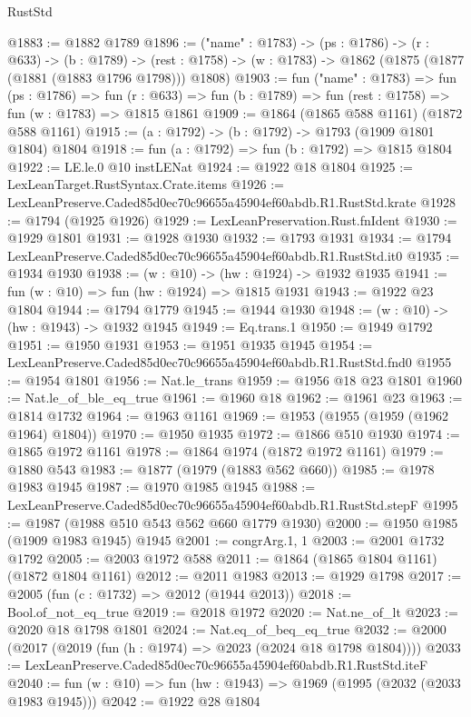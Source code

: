 \begin{lexlean}{RustStd}
\begin{coremodule}
@1883 := @1882 @1789
@1896 := ("name" : @1783) ->
  (ps : @1786) ->
  (r : @633) ->
  (b : @1789) ->
  (rest : @1758) -> (w : @1783) -> @1862 (@1875 (@1877 (@1881 (@1883 @1796 @1798))) @1808)
@1903 := fun ("name" : @1783) =>
  fun (ps : @1786) =>
  fun (r : @633) => fun (b : @1789) => fun (rest : @1758) => fun (w : @1783) => @1815 @1861
@1909 := @1864 (@1865 @588 @1161) (@1872 @588 @1161)
@1915 := (a : @1792) -> (b : @1792) -> @1793 (@1909 @1801 @1804) @1804
@1918 := fun (a : @1792) => fun (b : @1792) => @1815 @1804
@1922 := LE.le.{0} @10 instLENat
@1924 := @1922 @18 @1804
@1925 := LexLeanTarget.RustSyntax.Crate.items
@1926 := LexLeanPreserve.Caded85d0ec70c96655a45904ef60abdb.R1.RustStd.krate
@1928 := @1794 (@1925 @1926)
@1929 := LexLeanPreservation.Rust.fnIdent
@1930 := @1929 @1801
@1931 := @1928 @1930
@1932 := @1793 @1931
@1934 := @1794 LexLeanPreserve.Caded85d0ec70c96655a45904ef60abdb.R1.RustStd.it0
@1935 := @1934 @1930
@1938 := (w : @10) -> (hw : @1924) -> @1932 @1935
@1941 := fun (w : @10) => fun (hw : @1924) => @1815 @1931
@1943 := @1922 @23 @1804
@1944 := @1794 @1779
@1945 := @1944 @1930
@1948 := (w : @10) -> (hw : @1943) -> @1932 @1945
@1949 := Eq.trans.{1}
@1950 := @1949 @1792
@1951 := @1950 @1931
@1953 := @1951 @1935 @1945
@1954 := LexLeanPreserve.Caded85d0ec70c96655a45904ef60abdb.R1.RustStd.fnd0
@1955 := @1954 @1801
@1956 := Nat.le_trans
@1959 := @1956 @18 @23 @1801
@1960 := Nat.le_of_ble_eq_true
@1961 := @1960 @18
@1962 := @1961 @23
@1963 := @1814 @1732
@1964 := @1963 @1161
@1969 := @1953 (@1955 (@1959 (@1962 @1964) @1804))
@1970 := @1950 @1935
@1972 := @1866 @510 @1930
@1974 := @1865 @1972 @1161
@1978 := @1864 @1974 (@1872 @1972 @1161)
@1979 := @1880 @543
@1983 := @1877 (@1979 (@1883 @562 @660))
@1985 := @1978 @1983 @1945
@1987 := @1970 @1985 @1945
@1988 := LexLeanPreserve.Caded85d0ec70c96655a45904ef60abdb.R1.RustStd.stepF
@1995 := @1987 (@1988 @510 @543 @562 @660 @1779 @1930)
@2000 := @1950 @1985 (@1909 @1983 @1945) @1945
@2001 := congrArg.{1, 1}
@2003 := @2001 @1732 @1792
@2005 := @2003 @1972 @588
@2011 := @1864 (@1865 @1804 @1161) (@1872 @1804 @1161)
@2012 := @2011 @1983
@2013 := @1929 @1798
@2017 := @2005 (fun (c : @1732) => @2012 (@1944 @2013))
@2018 := Bool.of_not_eq_true
@2019 := @2018 @1972
@2020 := Nat.ne_of_lt
@2023 := @2020 @18 @1798 @1801
@2024 := Nat.eq_of_beq_eq_true
@2032 := @2000 (@2017 (@2019 (fun (h : @1974) => @2023 (@2024 @18 @1798 @1804))))
@2033 := LexLeanPreserve.Caded85d0ec70c96655a45904ef60abdb.R1.RustStd.iteF
@2040 := fun (w : @10) => fun (hw : @1943) => @1969 (@1995 (@2032 (@2033 @1983 @1945)))
@2042 := @1922 @28 @1804

\end{coremodule}
\end{lexlean}
